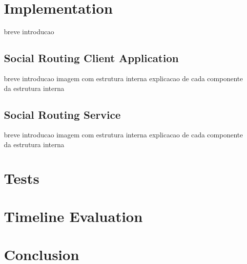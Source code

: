 \documentclass{article}
\begin{document}
    \section{Implementation}
        breve introducao

        \subsection*{Social Routing Client Application}
        breve introducao
        imagem com estrutura interna
        explicacao de cada componente da estrutura interna

        \subsection*{Social Routing Service}
        breve introducao
        imagem com estrutura interna
        explicacao de cada componente da estrutura interna

    \section{Tests}
    
    \section{Timeline Evaluation}

    \section{Conclusion}

    \printbibliography
\end{document}
